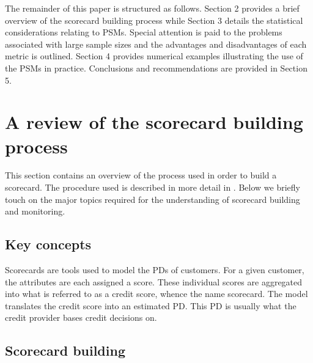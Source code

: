 \documentclass{article}
\theoremstyle{def}
\begin{document}
The remainder of this paper is structured as follows. Section 2 provides a brief overview of the scorecard building process while Section 3 details the statistical considerations relating to PSMs. Special attention is paid to the problems associated with large sample sizes and the advantages and disadvantages of each metric is outlined. Section 4 provides numerical examples illustrating the use of the PSMs in practice. Conclusions and recommendations are provided in Section 5.

\section{A review of the scorecard building process}

This section contains an overview of the process used in order to build a scorecard. The procedure used is described in more detail in \cite{SIDDIQI2016}. Below we briefly touch on the major topics required for the understanding of scorecard building and monitoring.

\subsection{Key concepts}

Scorecards are tools used to model the PDs of customers. For a given customer, the attributes are each assigned a score. These individual scores are aggregated into what is referred to as a credit score, whence the name scorecard.
The model translates the credit score into an estimated PD. This PD is usually what the credit provider bases credit decisions on.

\subsection{Scorecard building}

\end{document}
